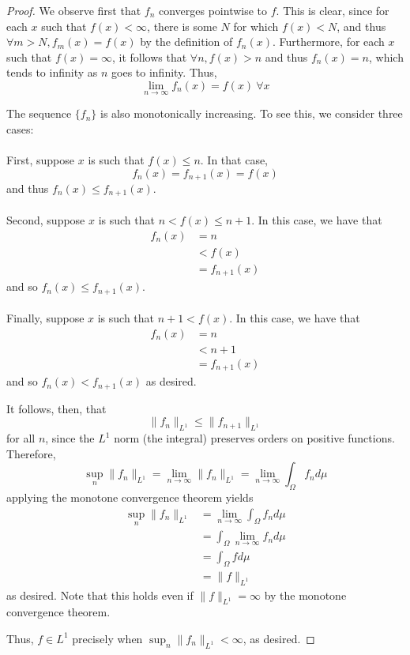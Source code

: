 \documentclass[fontsize=11pt]{scrartcl} %
\numberwithin{equation}{section} %
\numberwithin{figure}{section} %
\numberwithin{table}{section} %
\begin{document}
\begin{proof}
We observe first that $f_n$ converges pointwise to $f$. This is clear, since
    for each $x$ such that $f(x)<\infty$, there is some $N$ for which $f(x)<N$, and
    thus $\forall m>N, f_m(x) = f(x)$ by the definition of $f_n(x)$.
    Furthermore, for each $x$ such that $f(x)=\infty$, it follows that $\forall n, f(x)>n$ and
    thus $f_n(x) = n$, which tends to infinity as $n$ goes to infinity. Thus,
    \[
        \lim_{n\to\infty}f_n(x) = f(x)\ \forall x
    \]

    The sequence $\{f_n\}$ is also monotonically increasing. To see
    this, we consider three cases:
    \\
    \\
    First, suppose $x$ is such that $f(x) \leq n$. In that case,
    \[
        f_n(x) =
        f_{n+1}(x) = f(x)
    \]
    and thus $f_n(x)\leq f_{n+1}(x)$.
    \\
    \\
    Second, suppose $x$ is such that $n<f(x)\leq n+1$. In this case, we have
    that
    \[
        \begin{aligned}
            f_n(x) &= n\\
                    &<f(x)\\
                    &=f_{n+1}(x)
        \end{aligned}
    \]
    and so $f_n(x)\leq f_{n+1}(x)$.
    \\
    \\
    Finally, suppose $x$ is such that $n+1<f(x)$. In this case, we have that
    \[
        \begin{aligned}
            f_n(x) &= n\\
                    &< n+1\\
                    &=f_{n+1}(x)
        \end{aligned}
    \]
    and so $f_n(x)<f_{n+1}(x)$ as desired.

    It follows, then, that
    \[
        \|f_n\|_{L^1}\leq\|f_{n+1}\|_{L^1}
    \]
    for all $n$, since the $L^1$ norm (the integral) preserves orders on
    positive functions. Therefore,
    \[
        \sup_n\|f_n\|_{L^1} = \lim_{n\to\infty}\|f_n\|_{L^1}
        =\lim_{n\to\infty}\int_{\Omega}f_nd\mu
    \]
    applying the monotone convergence theorem yields
    \[
        \begin{aligned}
            \sup_n\|f_n\|_{L^1} &= \lim_{n\to\infty}\int_{\Omega}f_nd\mu\\
                                &=\int_{\Omega}\lim_{n\to\infty}f_nd\mu\\
                                &=\int_{\Omega}fd\mu\\
                                &=\|f\|_{L^1}
        \end{aligned}
    \]
    as desired. Note that this holds even if $\|f\|_{L^1} = \infty$ by the
    monotone convergence theorem.

    Thus, $f\in L^1$ precisely when $\sup_n\|f_n\|_{L^1}<\infty$, as desired.
\end{proof}
\end{document}
